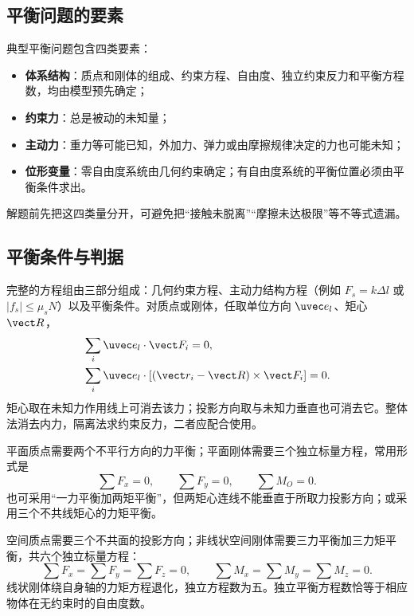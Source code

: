 \subsection{平衡问题的要素}

典型平衡问题包含四类要素：
\begin{itemize}
 \item \textbf{体系结构}：质点和刚体的组成、约束方程、自由度、独立约束反力和平衡方程数，均由模型预先确定；
 \item \textbf{约束力}：总是被动的未知量；
 \item \textbf{主动力}：重力等可能已知，外加力、弹力或由摩擦规律决定的力也可能未知；
 \item \textbf{位形变量}：零自由度系统由几何约束确定；有自由度系统的平衡位置必须由平衡条件求出。
\end{itemize}
解题前先把这四类量分开，可避免把“接触未脱离”“摩擦未达极限”等不等式遗漏。

\subsection{平衡条件与判据}

完整的方程组由三部分组成：几何约束方程、主动力结构方程（例如 $F_s=k\Delta l$ 或 $|f_s|\le\mu_sN$）以及平衡条件。对质点或刚体，任取单位方向 $\uvec e_l$、矩心 $\vect R$，
\begin{align}
 &\sum_i\uvec e_l\cdot\vect F_i=0, \label{r2ch03:eq:016}\\
 &\sum_i\uvec e_l\cdot[(\vect r_i-\vect R)\times\vect F_i]=0 . \label{r2ch03:eq:017}
\end{align}
矩心取在未知力作用线上可消去该力；投影方向取与未知力垂直也可消去它。整体法消去内力，隔离法求约束反力，二者应配合使用。

平面质点需要两个不平行方向的力平衡；平面刚体需要三个独立标量方程，常用形式是
\begin{equation}
 \sum F_x=0,\qquad \sum F_y=0,\qquad \sum M_O=0.
 \label{r2ch03:eq:018}
\end{equation}
也可采用“一力平衡加两矩平衡”，但两矩心连线不能垂直于所取力投影方向；或采用三个不共线矩心的力矩平衡。

空间质点需要三个不共面的投影方向；非线状空间刚体需要三力平衡加三力矩平衡，共六个独立标量方程：
\begin{equation}
 \sum F_x=\sum F_y=\sum F_z=0,\qquad
 \sum M_x=\sum M_y=\sum M_z=0 .
 \label{r2ch03:eq:019}
\end{equation}
线状刚体绕自身轴的力矩方程退化，独立方程数为五。独立平衡方程数恰等于相应物体在无约束时的自由度数。

